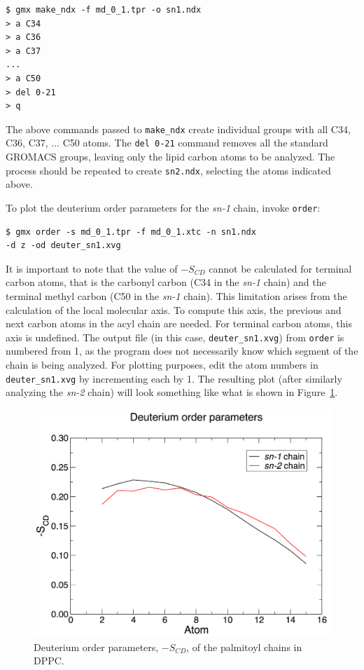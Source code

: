 \documentclass[9pt,tutorial]{livecoms}
\begin{document}
\begin{verbatim}
$ gmx make_ndx -f md_0_1.tpr -o sn1.ndx
> a C34
> a C36
> a C37
...
> a C50
> del 0-21
> q
\end{verbatim}

The above commands passed to \texttt{make\_ndx} create individual groups with all C34, C36, C37, ... C50 atoms. The \texttt{del 0-21} command removes all the standard GROMACS groups, leaving only the lipid carbon atoms to be analyzed. The process should be repeated to create \texttt{sn2.ndx}, selecting the atoms indicated above.

To plot the deuterium order parameters for the {\em sn-1} chain, invoke \texttt{order}:

\begin{verbatim}
$ gmx order -s md_0_1.tpr -f md_0_1.xtc -n sn1.ndx
-d z -od deuter_sn1.xvg
\end{verbatim}

It is important to note that the value of $-S_{CD}$ cannot be calculated for terminal carbon atoms, that is the carbonyl carbon (C34 in the {\em sn-1} chain) and the terminal methyl carbon (C50 in the {\em sn-1} chain). This limitation arises from the calculation of the local molecular axis. To compute this axis, the previous and next carbon atoms in the acyl chain are needed. For terminal carbon atoms, this axis is undefined. The output file (in this case, \texttt{deuter\_sn1.xvg}) from \texttt{order} is numbered from 1, as the program does not necessarily know which segment of the chain is being analyzed. For plotting purposes, edit the atom numbers in \texttt{deuter\_sn1.xvg} by incrementing each by 1. The resulting plot (after similarly analyzing the {\em sn-2} chain) will look something like what is shown in Figure~\ref{kalp_dppc_scd_fig}.

\begin{figure}[h!]
\centering
\includegraphics{plot_kalp_dppc_Scd}
\caption{Deuterium order parameters, $-S_{CD}$, of the palmitoyl chains in DPPC.}
\label{kalp_dppc_scd_fig}
\end{figure}
\end{document}
